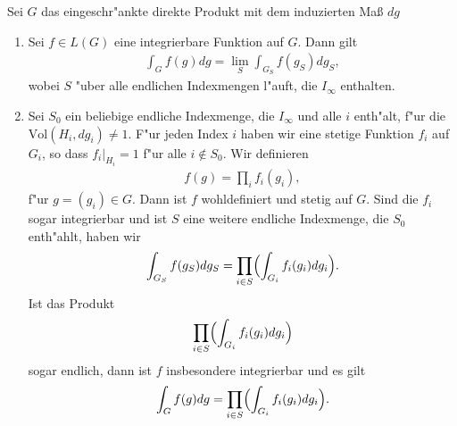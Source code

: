 		\begin{proposition}
			Sei $G$ das eingeschr"ankte direkte Produkt mit dem induzierten Maß $dg$
			\begin{enumerate}[label=(\roman*)]
				\item Sei $f \in L(G)$ eine integrierbare Funktion auf $G$. Dann gilt
					\begin{align*}
						\int_G f(g)dg = \lim_S \int_{G_S} f(g_S) dg_S,
					\end{align*}
					wobei $S$ "uber alle endlichen Indexmengen l"auft, die $I_\infty$ enthalten.
				\item Sei $S_0$ ein beliebige endliche Indexmenge, die $I_\infty$ und alle $i$ enth"alt, f"ur die $\text{Vol}(H_i, dg_i) \not= 1$. 
					F"ur jeden Index $i$ haben wir eine stetige Funktion $f_i$ auf $G_i$, so dass $f_i |_{H_i} = 1$ f"ur alle $i \notin S_0$. 
					Wir definieren
					\begin{align*}
						f(g) = \prod_{i}f_{i}(g_i),
					\end{align*}
					f"ur $g=(g_i) \in G$. 
					Dann ist $f$ wohldefiniert und stetig auf $G$. 
					Sind die $f_i$ sogar integrierbar und ist $S$ eine weitere endliche Indexmenge, die $S_0$ enth"ahlt, haben wir
					\begin{align*}
						\int_{G_S} f(g_S) dg_S = \prod_{i \in S}\Bigl(\int_{G_i} f_i (g_i)dg_i\Bigr).
					\end{align*}
					Ist das Produkt
					\begin{align*}
						\prod_{i \in S}\Bigl(\int_{G_i} f_i (g_i)dg_i\Bigr)
					\end{align*}
					sogar endlich, dann ist $f$ insbesondere integrierbar und es gilt
					\begin{align*}
						\int_{G} f(g) dg = \prod_{i \in S}\Bigl(\int_{G_i} f_i (g_i)dg_i\Bigr).
					\end{align*}	
			\end{enumerate}
		\end{proposition}
		
